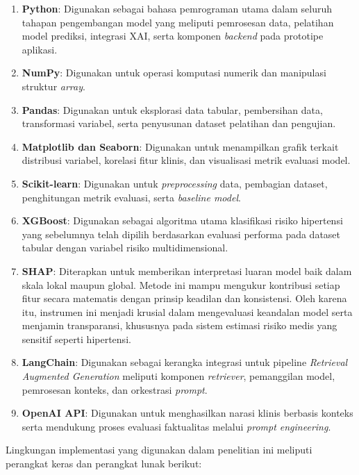 \begin{enumerate}
    \item \textbf{Python}: Digunakan sebagai bahasa pemrograman utama dalam seluruh tahapan pengembangan model yang meliputi pemrosesan data, pelatihan model prediksi, integrasi XAI, serta komponen \textit{backend} pada prototipe aplikasi.
    \item \textbf{NumPy}: Digunakan untuk operasi komputasi numerik dan manipulasi struktur \textit{array}.
    \item \textbf{Pandas}: Digunakan untuk eksplorasi data tabular, pembersihan data, transformasi variabel, serta penyusunan dataset pelatihan dan pengujian.
    \item \textbf{Matplotlib dan Seaborn}: Digunakan untuk menampilkan grafik terkait distribusi variabel, korelasi fitur klinis, dan visualisasi metrik evaluasi model.
    \item \textbf{Scikit-learn}: Digunakan untuk \textit{preprocessing} data, pembagian dataset, penghitungan metrik evaluasi, serta \textit{baseline model}.
    \item \textbf{XGBoost}: Digunakan sebagai algoritma utama klasifikasi risiko hipertensi yang sebelumnya telah dipilih berdasarkan evaluasi performa pada dataset tabular dengan variabel risiko multidimensional.
    \item \textbf{SHAP}: Diterapkan untuk memberikan interpretasi luaran model baik dalam skala lokal maupun global. Metode ini mampu mengukur kontribusi setiap fitur secara matematis dengan prinsip keadilan dan konsistensi. Oleh karena itu, instrumen ini menjadi krusial dalam mengevaluasi keandalan model serta menjamin transparansi, khususnya pada sistem estimasi risiko medis yang sensitif seperti hipertensi.
    \item \textbf{LangChain}: Digunakan sebagai kerangka integrasi untuk pipeline \textit{Retrieval Augmented Generation} meliputi komponen \textit{retriever}, pemanggilan model, pemrosesan konteks, dan orkestrasi \textit{prompt}.
    \item \textbf{OpenAI API}: Digunakan untuk menghasilkan narasi klinis berbasis konteks serta mendukung proses evaluasi faktualitas melalui \textit{prompt engineering}.
\end{enumerate}

Lingkungan implementasi yang digunakan dalam penelitian ini meliputi perangkat keras dan perangkat lunak berikut:

